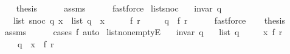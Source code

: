 \begin{isabellebody}
\ \ \isamarkupfalse%
\ {\isacharquery}{\kern0pt}thesis\isanewline
\ \ \ \ \isamarkupfalse%
\ assms\isanewline
\ \ \ \ \isamarkupfalse%
\ fastforce\isanewline
{}\isamarkupfalse%
%
\endisatagproof
{\isafoldproof}%
%
\isadelimproof
\isanewline
%
\endisadelimproof
%
\isadeliminvisible
\isanewline
%
\endisadeliminvisible
%
\isataginvisible
{}\isamarkupfalse%
\ list{\isacharunderscore}{\kern0pt}snoc{\isacharcolon}{\kern0pt}\isanewline
\ \ \ {\isachardoublequoteopen}invar\ q{\isachardoublequoteclose}\isanewline
\ \ \ {\isachardoublequoteopen}list\ {\isacharparenleft}{\kern0pt}snoc\ q\ x{\isacharparenright}{\kern0pt}\ {\isacharequal}{\kern0pt}\ list\ q\ {\isacharat}{\kern0pt}\ {\isacharbrackleft}{\kern0pt}x{\isacharbrackright}{\kern0pt}{\isachardoublequoteclose}%
\endisataginvisible
{\isafoldinvisible}%
%
\isadeliminvisible
\isanewline
%
\endisadeliminvisible
%
\isadelimproof
%
\endisadelimproof
%
\isatagproof
{}\isamarkupfalse%
\ {\isacharminus}{\kern0pt}\isanewline
\ \ \isamarkupfalse%
\ f\ r\ \isanewline
\ \ \ \ {\isachardoublequoteopen}q\ {\isacharequal}{\kern0pt}\ {\isacharparenleft}{\kern0pt}f{\isacharcomma}{\kern0pt}\ r{\isacharparenright}{\kern0pt}{\isachardoublequoteclose}\isanewline
\ \ \ \ \isamarkupfalse%
\ fastforce\isanewline
\ \ \isamarkupfalse%
\ {\isacharquery}{\kern0pt}thesis\isanewline
\ \ \ \ \isamarkupfalse%
\ assms\isanewline
\ \ \ \ \isamarkupfalse%
\ {\isacharparenleft}{\kern0pt}cases\ f{\isacharparenright}{\kern0pt}\ auto\isanewline
{}\isamarkupfalse%
%
\endisatagproof
{\isafoldproof}%
%
\isadelimproof
\isanewline
%
\endisadelimproof
%
\isadeliminvisible
\isanewline
%
\endisadeliminvisible
%
\isataginvisible
{}\isamarkupfalse%
\ list{\isacharunderscore}{\kern0pt}non{\isacharunderscore}{\kern0pt}emptyE{\isacharcolon}{\kern0pt}\isanewline
\ \ \ {\isachardoublequoteopen}invar\ q{\isachardoublequoteclose}\isanewline
\ \ \ {\isachardoublequoteopen}list\ q\ {\isasymnoteq}\ {\isacharbrackleft}{\kern0pt}{\isacharbrackright}{\kern0pt}{\isachardoublequoteclose}\isanewline
\ \ \ x\ f\ r\ \isanewline
\ \ \ \ {\isachardoublequoteopen}q\ {\isacharequal}{\kern0pt}\ {\isacharparenleft}{\kern0pt}x\ {\isacharhash}{\kern0pt}\ f{\isacharcomma}{\kern0pt}\ r{\isacharparenright}{\kern0pt}{\isachardoublequoteclose}%
\endisataginvisible

\end{isabellebody}
